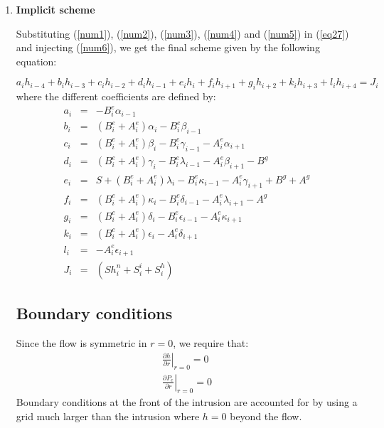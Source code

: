 \begin{article}
\begin{enumerate}
 
 \item \textbf{Implicit scheme}
 
Substituting (\ref{num1}), (\ref{num2}), (\ref{num3}), (\ref{num4}) and (\ref{num5}) in (\ref{eq27}) and injecting (\ref{num6}), we get the final scheme given by the following equation:

\begin{equation}
a_ih_{i-4}+b_ih_{i-3}+c_ih_{i-2}+d_ih_{i-1}+e_ih_i+f_ih_{i+1}+g_ih_{i+2}+k_ih_{i+3}+l_ih_{i+4}=J_i
\label{eqd3}
\end{equation}
where the different coefficients are defined by:
\begin{eqnarray}
a_i&=&-B_i^{e}\alpha_{i-1} \\
b_i&=&(B_i^{e}+A_i^{e})\alpha_{i}-B_i^{e}\beta_{i-1} \\
c_i&=&(B_i^{e}+A_i^{e})\beta_{i}-B_i^{e}\gamma_{i-1}-A_i^{e}\alpha_{i+1} \\
d_i&=&(B_i^{e}+A_i^{e})\gamma_{i}-B_i^{e}\lambda_{i-1}-A_i^{e}\beta_{i+1} -B^{g}\\
e_i&=&S+(B_i^{e}+A_i^{e})\lambda_{i}-B_i^{e}\kappa_{i-1}-A_i^{e}\gamma_{i+1} +B^{g}+A^{g}\\
f_i&=&(B_i^{e}+A_i^{e})\kappa_{i}-B_i^{e}\delta_{i-1}-A_i^{e}\lambda_{i+1} - A^{g}\\
g_i&=&(B_i^{e}+A_i^{e})\delta_{i}-B_i^{e}\epsilon_{i-1}-A_i^{e}\kappa_{i+1} \\
k_i&=&(B_i^{e}+A_i^{e})\epsilon_{i}-A_i^{e}\delta_{i+1} \\
l_i&=&-A_i^{e}\epsilon_{i+1} \\
J_i&=&(Sh_i^n+ S^{i}_{i}+S^{h}_{i})
\end{eqnarray}	
	\subsection{Boundary conditions}
	
Since the flow is symmetric in $r=0$, we require that:
	\begin{eqnarray}
	\left.\frac{\partial h}{\partial r}\right|_{r=0}=0\\
	\left.\frac{\partial P_{e}}{\partial r}\right|_{r=0}=0
	\end{eqnarray}
 Boundary conditions at the front of the intrusion are accounted for by using a grid much larger than the intrusion where $h=0$ beyond the flow.


\end{enumerate}
\end{article}
